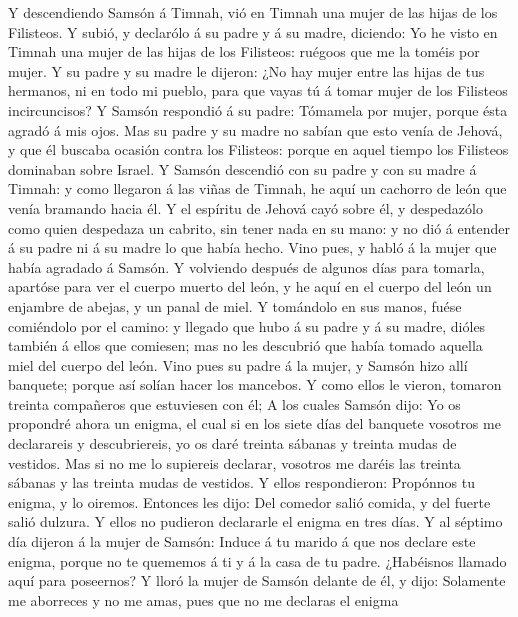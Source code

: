  Y descendiendo Samsón á Timnah, vió en Timnah una mujer
de las hijas de los Filisteos.  Y subió, y declarólo á su
padre y á su madre, diciendo: Yo he visto en Timnah una mujer de las
hijas de los Filisteos: ruégoos que me la toméis por mujer.
 Y su padre y su madre le dijeron: ¿No hay mujer entre las
hijas de tus hermanos, ni en todo mi pueblo, para que vayas tú á tomar
mujer de los Filisteos incircuncisos? Y Samsón respondió á su padre:
Tómamela por mujer, porque ésta agradó á mis ojos.  Mas su
padre y su madre no sabían que esto venía de Jehová, y que él buscaba
ocasión contra los Filisteos: porque en aquel tiempo los Filisteos
dominaban sobre Israel.  Y Samsón descendió con su padre y
con su madre á Timnah: y como llegaron á las viñas de Timnah, he aquí un
cachorro de león que venía bramando hacia él.  Y el
espíritu de Jehová cayó sobre él, y despedazólo como quien despedaza un
cabrito, sin tener nada en su mano: y no dió á entender á su padre ni á
su madre lo que había hecho.  Vino pues, y habló á la
mujer que había agradado á Samsón.  Y volviendo después de
algunos días para tomarla, apartóse para ver el cuerpo muerto del león,
y he aquí en el cuerpo del león un enjambre de abejas, y un panal de
miel.  Y tomándolo en sus manos, fuése comiéndolo por el
camino: y llegado que hubo á su padre y á su madre, dióles también á
ellos que comiesen; mas no les descubrió que había tomado aquella miel
del cuerpo del león.  Vino pues su padre á la mujer, y
Samsón hizo allí banquete; porque así solían hacer los mancebos.
 Y como ellos le vieron, tomaron treinta compañeros que
estuviesen con él;  A los cuales Samsón dijo: Yo os
propondré ahora un enigma, el cual si en los siete días del banquete
vosotros me declarareis y descubriereis, yo os daré treinta sábanas y
treinta mudas de vestidos.  Mas si no me lo supiereis
declarar, vosotros me daréis las treinta sábanas y las treinta mudas de
vestidos. Y ellos respondieron: Propónnos tu enigma, y lo oiremos.
 Entonces les dijo: Del comedor salió comida, y del
fuerte salió dulzura. Y ellos no pudieron declararle el enigma en tres
días.  Y al séptimo día dijeron á la mujer de Samsón:
Induce á tu marido á que nos declare este enigma, porque no te quememos
á ti y á la casa de tu padre. ¿Habéisnos llamado aquí para poseernos?
 Y lloró la mujer de Samsón delante de él, y dijo:
Solamente me aborreces y no me amas, pues que no me declaras el enigma
